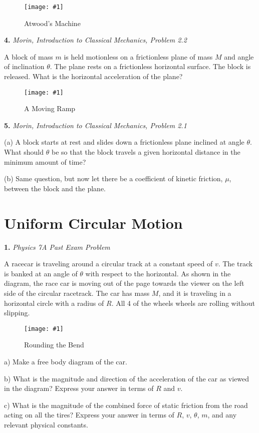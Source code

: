 \documentclass[11pt]{article}
\newcommand{\fig}[4]{
    \begin{figure}[H]
        \centering
        \texttt{[image: \#1]}
        \caption{#2}
        \label{exp4fit}
    \end{figure}
}
\theoremstyle{gangnamstyle}{\newtheorem{definition}{Definition}[]}
\theoremstyle{gangnamstyle}{\newtheorem{example}{Example}[]}
\theoremstyle{gangnamstyle}{\newtheorem{problem}{Problem}[]}
\begin{document}
\fig{figs/mt1/atwood1.png}{Atwood's Machine}{0.75}{0}

\pagebreak

\textbf{4.} \textit{Morin, Introduction to Classical Mechanics, Problem 2.2} 

A block of mass $m$ is held motionless on a frictionless plane of mass $M$ and angle of inclination $\theta$. The plane rests on a frictionless horizontal surface. The block is released. What is the horizontal acceleration of the plane?

\fig{figs/mt1/morin2.png}{A Moving Ramp}{1.1}{0}

\pagebreak

\textbf{5.} \textit{Morin, Introduction to Classical Mechanics, Problem 2.1} 

(a) A block starts at rest and slides down a frictionless plane inclined at angle $\theta$. What should $\theta$ be so that the block travels a given horizontal distance in the minimum amount of time?

(b) Same question, but now let there be a coefficient of kinetic friction, $\mu$, between the block and the plane.

\pagebreak

\section{Uniform Circular Motion}

\textbf{1.} \textit{Physics 7A Past Exam Problem}

A racecar is traveling around a circular track at a constant speed of $v$. The track is banked at an angle of $\theta$ with respect to the horizontal. As shown in the diagram, the race car is moving out of the page towards the viewer on the left side of the circular racetrack. The car has mass $M$, and it is traveling in a horizontal circle with a radius of $R$. All 4 of the wheels wheels are rolling without slipping.

\fig{figs/mt1/car.png}{Rounding the Bend}{0.75}{0}

a) Make a free body diagram of the car.

b) What is the magnitude and direction of the acceleration of the car as viewed in the diagram? Express your answer in terms of $R$ and $v$.

c) What is the magnitude of the combined force of static friction from the road acting on all the tires? Express your answer in terms of $R$, $v$, $\theta$, $m$, and any relevant physical constants.
\end{document}
